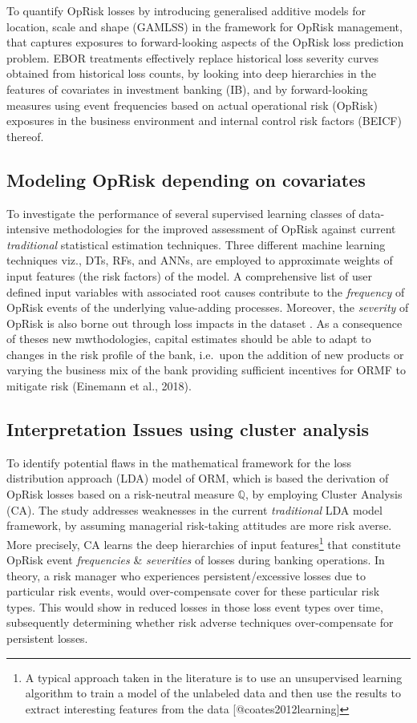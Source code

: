 \documentclass{DissertateUSU}
\begin{document}
To quantify OpRisk losses by introducing generalised additive models for
location, scale and shape (GAMLSS) in the framework for OpRisk
management, that captures exposures to forward-looking aspects of the
OpRisk loss prediction problem. EBOR treatments effectively replace
historical loss severity curves obtained from historical loss counts, by
looking into deep hierarchies in the features of covariates in
investment banking (IB), and by forward-looking measures using event
frequencies based on actual operational risk (OpRisk) exposures in the
business environment and internal control risk factors (BEICF) thereof.

\subsection{Modeling OpRisk depending on covariates}

To investigate the performance of several supervised learning classes of
data-intensive methodologies for the improved assessment of OpRisk
against current \emph{traditional} statistical estimation techniques.
Three different machine learning techniques viz., DTs, RFs, and ANNs,
are employed to approximate weights of input features (the risk factors)
of the model. A comprehensive list of user defined input variables with
associated root causes contribute to the \emph{frequency} of OpRisk
events of the underlying value-adding processes. Moreover, the
\emph{severity} of OpRisk is also borne out through loss impacts in the
dataset . As a consequence of theses new mwthodologies, capital
estimates should be able to adapt to changes in the risk profile of the
bank, i.e.~upon the addition of new products or varying the business mix
of the bank providing sufficient incentives for ORMF to mitigate risk
(Einemann et al., 2018).

\subsection{Interpretation Issues using cluster analysis}

To identify potential flaws in the mathematical framework for the loss
distribution approach (LDA) model of ORM, which is based the derivation
of OpRisk losses based on a risk-neutral measure \(\mathbb{Q}\), by
employing Cluster Analysis (CA). The study addresses weaknesses in the
current \emph{traditional} LDA model framework, by assuming managerial
risk-taking attitudes are more risk averse. More precisely, CA learns
the deep hierarchies of input
features\footnote{A typical approach taken in the literature is to use an unsupervised learning algorithm to train a model of the unlabeled data and then use the results to extract interesting features from the data [@coates2012learning]}
that constitute OpRisk event \emph{frequencies} \& \emph{severities} of
losses during banking operations. In theory, a risk manager who
experiences persistent/excessive losses due to particular risk events,
would over-compensate cover for these particular risk types. This would
show in reduced losses in those loss event types over time, subsequently
determining whether risk adverse techniques over-compensate for
persistent losses.
\end{document}
